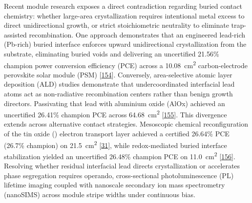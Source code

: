 \documentclass[
  11pt,
]{article}
\begin{document}
Recent module research exposes a direct contradiction regarding buried
contact chemistry: whether large-area crystallization requires
intentional metal excess to direct unidirectional growth, or strict
stoichiometric neutrality to eliminate trap-assisted recombination. One
approach demonstrates that an engineered lead-rich (Pb-rich) buried
interface enforces upward unidirectional crystallization from the
substrate, eliminating buried voids and delivering an uncertified
21.56\% champion power conversion efficiency (PCE) across a
\qty{10.08}{\centi\meter\squared} carbon-electrode perovskite solar
module (PSM) {[}\href{https://doi.org/10.1002/adma.73502}{154}{]}.
Conversely, area-selective atomic layer deposition (ALD) studies
demonstrate that undercoordinated interfacial lead atoms act as
non-radiative recombination centers rather than benign growth directors.
Passivating that lead with aluminium oxide (AlOx) achieved an
uncertified 26.41\% champion PCE across
\qty{64.68}{\centi\meter\squared}
{[}\href{https://doi.org/10.1002/anie.202516537}{155}{]}. This
divergence extends across alternative contact strategies. Mesoscopic
chemical reconfiguration of the tin oxide () electron transport
layer achieved a certified 26.64\% PCE (26.7\% champion) on
\qty{21.5}{\centi\meter\squared}
{[}\href{https://doi.org/10.1002/adma.73286}{31}{]}, while
redox-mediated buried interface stabilization yielded an uncertified
26.48\% champion PCE on \qty{11.0}{\centi\meter\squared}
{[}\href{https://doi.org/10.1002/anie.4012708}{156}{]}. Resolving
whether residual interfacial lead directs crystallization or accelerates
phase segregation requires operando, cross-sectional photoluminescence
(PL) lifetime imaging coupled with nanoscale secondary ion mass
spectrometry (nanoSIMS) across module stripe widths under continuous
bias.
\end{document}
